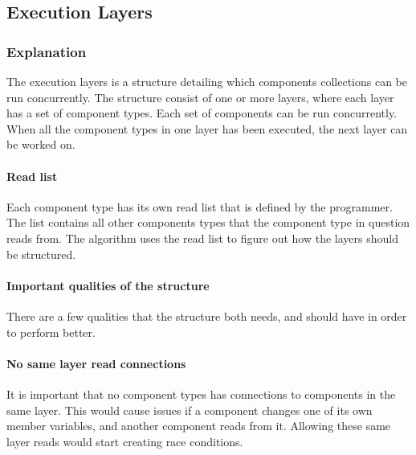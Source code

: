\subsection{Execution Layers}
\label{subsec:detailed_execution_layers}
\subsubsection{Explanation}
The execution layers is a structure detailing which components collections can be run concurrently.
The structure consist of one or more layers, where each layer has a set of component types.
Each set of components can be run concurrently.
When all the component types in one layer has been executed, the next layer can be worked on.

\paragraph{Read list}
\label{subsec:detailed_read_list}
Each component type has its own read list that is defined by the programmer.
The list contains all other components types that the component type in question reads from.
The algorithm uses the read list to figure out how the layers should be structured.

\paragraph{Important qualities of the structure}
There are a few qualities that the structure both needs, and should have in order to perform better.

\paragraph{No same layer read connections}
It is important that no component types has connections to components in the same layer.
This would cause issues if a component changes one of its own member variables, and another component reads from it.
Allowing these same layer reads would start creating race conditions.

